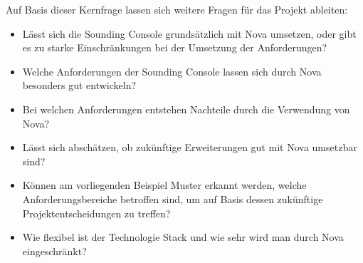 Auf Basis dieser Kernfrage lassen sich weitere Fragen für das Projekt ableiten:
\begin{itemize}
    \item Lässt sich die Sounding Console grundsätzlich mit Nova umsetzen, oder gibt es zu starke Einschränkungen bei der Umsetzung der Anforderungen?
    \item Welche Anforderungen der Sounding Console lassen sich durch Nova besonders gut entwickeln?
    \item Bei welchen Anforderungen entstehen Nachteile durch die Verwendung von Nova?
    \item Lässt sich abschätzen, ob zukünftige Erweiterungen gut mit Nova umsetzbar sind?
    \item Können am vorliegenden Beispiel Muster erkannt werden, welche Anforderungsbereiche betroffen sind, um auf Basis dessen zukünftige Projektentscheidungen zu treffen?
    \item Wie flexibel ist der Technologie Stack und wie sehr wird man durch Nova eingeschränkt?
\end{itemize}
